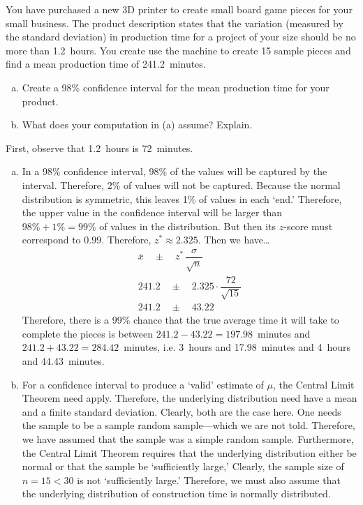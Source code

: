 \documentclass[11pt,letterpaper]{article}
\begin{document}
 You have purchased a new 3D printer to create small board game pieces for your small business. The product description states that the variation (measured by the standard deviation) in production time for a project of your size should be no more than 1.2~hours. You create use the machine to create 15 sample pieces and find a mean production time of 241.2~minutes. 
	\begin{enumerate}[(a)]
	\item Create a 98\% confidence interval for the mean production time for your product. 
	\item What does your computation in (a) assume? Explain. 
	\end{enumerate} \pspace

\sol First, observe that 1.2~hours is 72~minutes. 
\begin{enumerate}[(a)]
\item In a 98\% confidence interval, 98\% of the values will be captured by the interval. Therefore, 2\% of values will not be captured. Because the normal distribution is symmetric, this leaves 1\% of values in each `end.' Therefore, the upper value in the confidence interval will be larger than $98\% + 1\%= 99\%$ of values in the distribution. But then its $z$-score must correspond to $0.99$. Therefore, $z^* \approx 2.325$. Then we have\dots
	\[
	\begin{gathered}
	\overline{x} \quad \pm \quad z^* \, \dfrac{\sigma}{\sqrt{n}} \\
	241.2 \quad \pm \quad 2.325 \cdot \dfrac{72}{\sqrt{15}} \\
	241.2 \quad \pm \quad 43.22
	\end{gathered}
	\]
Therefore, there is a 99\% chance that the true average time it will take to complete the pieces is between $241.2 - 43.22= 197.98$~minutes and $241.2 + 43.22= 284.42$~minutes, i.e. 3~hours and 17.98~minutes and 4~hours and 44.43~minutes. \pspace

\item For a confidence interval to produce a `valid' estimate of $\mu$, the Central Limit Theorem need apply. Therefore, the underlying distribution need have a mean and a finite standard deviation. Clearly, both are the case here. One needs the sample to be a sample random sample---which we are not told. Therefore, we have assumed that the sample was a simple random sample. Furthermore, the Central Limit Theorem requires that the underlying distribution either be normal or that the sample be `sufficiently large,' Clearly, the sample size of $n= 15 < 30$ is not `sufficiently large.' Therefore, we must also assume that the underlying distribution of construction time is normally distributed. 
\end{enumerate}
\end{document}
